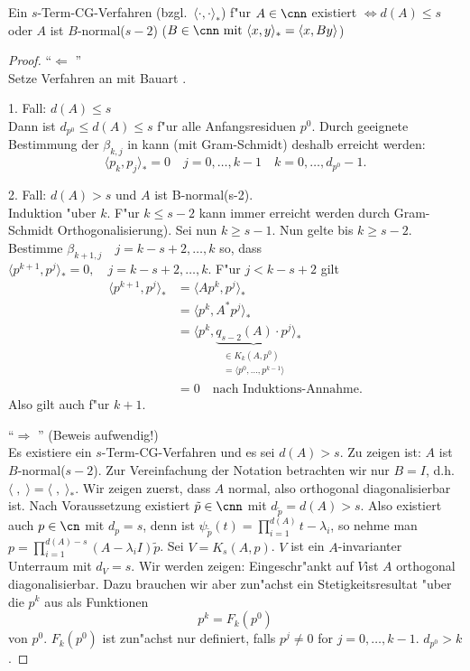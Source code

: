 %
\begin{sa} \label{faber_sa}
Ein $s$-Term-CG-Verfahren (bzgl.\ $\langle \cdot, \cdot \rangle_*$) f"ur $A \in \cnn$ 
existiert $\Leftrightarrow d(A) \leq s$ oder $A$ ist $B$-normal($s-2$)
($B\in \cnn \text{ mit } \langle x , y \rangle_* = \langle x , By \rangle $)
\end{sa}
\begin{proof}
"`$ \Longleftarrow$ "' \\
Setze Verfahren an mit Bauart . \medskip

1. Fall: $d(A) \leq s$ \\
Dann ist $d_{p^0} \leq d(A) \leq s$ f"ur alle Anfangsresiduen $p^0$.
Durch geeignete Bestimmung der $\beta_{k,j}$ in  kann
(mit Gram-Schmidt) deshalb erreicht werden:
\[
\langle p_k , p_j \rangle_*=0 \quad j=0,\dots,k-1 \quad k=0,\dots,d_{p^0}-1.
\]
\medskip

2. Fall: $d(A)>s$ und $A$ ist B-normal(s-2). \\
Induktion "uber $k$. F"ur $k\leq s-2$ kann  immer erreicht werden
durch Gram-Schmidt Orthogonalisierung). Sei nun $k \geq s-1$.
Nun gelte  bis  $k\geq s-2$.
Bestimme $\beta_{k+1,j} \quad j=k-s+2,\dots,k$ so, dass $\langle p^{k+1} , p^j \rangle_*=0,\quad j=k-s+2,\dots,k$.
F"ur $j<k-s+2$ gilt
\begin{align*}
\langle p^{k+1} , p^j \rangle_* & = \langle Ap^k , p^j \rangle_* \\
                                & = \langle p^k , A^* p^j  \rangle_* \\
                                & = \langle p^k ,\underbrace{q_{s-2}(A)\cdot p^j}_{\substack{\in K_k(A,p^0) \\ =\langle p^0,\dots , p^{k-1} \rangle}}  \rangle_* \\
                                & = 0 \quad \text{nach Induktions-Annahme.}
\end{align*}
Also gilt  auch f"ur $k+1$.
\medskip

"`$ \Longrightarrow$ "' (Beweis aufwendig!)\\
Es existiere ein $s$-Term-CG-Verfahren und es sei $d(A)>s$. Zu zeigen ist: $A$ ist $B$-normal($s-2$).
Zur Vereinfachung der Notation betrachten wir nur $B=I$, d.h. $\langle \; , \; \rangle=\langle \; , \; \rangle_* $.
Wir zeigen zuerst, dass $A$ normal, also orthogonal diagonalisierbar ist.
Nach Voraussetzung existiert $\tilde{p} \in \cnn$ mit $d_{\tilde{p}}=d(A)>s$.
Also existiert auch $p \in \cn$ mit $d_p=s$, denn ist
$\psi_{\tilde{p}}(t)= \prod_{i=1}^{d(A)}{t-\lambda_i}$, so nehme man
$p=\prod_{i=1}^{d(A)-s}{(A-\lambda_i I)\tilde{p}}$.
Sei $V=K_s(A,p)$. $V$ ist ein $A$-invarianter Unterraum mit $d_V=s$.
Wir werden zeigen: Eingeschr"ankt auf $V$ist $A$ orthogonal diagonalisierbar.
Dazu brauchen wir aber zun"achst ein Stetigkeitsresultat "uber die $p^k$ aus
 als Funktionen
 \[
  p^k  =  F_k(p^0)
\]
von $p^0$. $F_k(p^0)$ ist zun"achst nur definiert, falls $p^j \not = 0$
for $j=0,\ldots,k-1$. $d_{p^0} > k$.


\end{proof}
